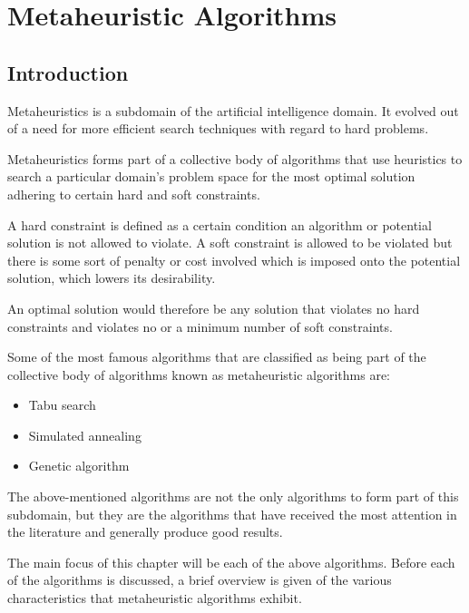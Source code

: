 \chapter{Metaheuristic Algorithms}
\label{chpt:heuristic}
\section{Introduction}
Metaheuristics is a subdomain of the artificial intelligence domain\cite{AIModernApproach}. It evolved out of a need for more efficient search techniques with regard to hard problems. 

Metaheuristics forms part of a collective body of algorithms that use heuristics to search a particular domain's problem space for the most optimal solution adhering to certain hard and soft constraints\cite{AIModernApproach,NatureInspiredMetaHeuristic}. 

A hard constraint is defined as a certain condition an algorithm or potential solution is not allowed to violate\cite{AIModernApproach,NatureInspiredMetaHeuristic,Karen2004,Eisenblatter}. A soft constraint is allowed to be violated but there is some sort of penalty or cost involved which is imposed onto the potential solution, which lowers its desirability\cite{AIModernApproach,NatureInspiredMetaHeuristic,Karen2004,Eisenblatter}. 

An optimal solution would therefore be any solution that violates no hard constraints and violates no or a minimum number of soft constraints\cite{AIModernApproach,NatureInspiredMetaHeuristic,Karen2004,Eisenblatter}.

Some of the most famous algorithms that are classified as being part of the collective body of algorithms known as metaheuristic algorithms are:
\begin{itemize}
\item Tabu search
\item Simulated annealing
\item Genetic algorithm
\end{itemize}
The above-mentioned algorithms are not the only algorithms to form part of this subdomain, but they are the algorithms that have received the most attention in the literature and generally produce good results\cite{SweepMeta}.

The main focus of this chapter will be each of the above algorithms. Before each of the algorithms is discussed, a brief overview is given of the various characteristics that metaheuristic algorithms exhibit. 

